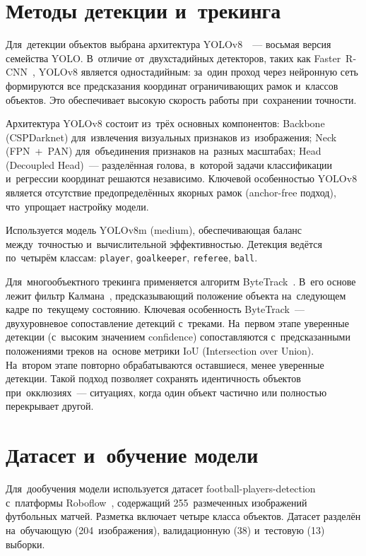 \documentclass{stud-conf-pmk}
\begin{document}
\begin{paper}
\section{Методы детекции и~трекинга}

Для~детекции объектов выбрана архитектура YOLOv8~\cite{bib_yolov8_ultralytics}~--- восьмая версия семейства YOLO. В~отличие от~двухстадийных детекторов, таких как Faster~R-CNN~\cite{bib_faster_rcnn}, YOLOv8 является одностадийным: за~один проход через нейронную сеть формируются все предсказания координат ограничивающих рамок и~классов объектов. Это обеспечивает высокую скорость работы при~сохранении точности.

Архитектура YOLOv8 состоит из~трёх основных компонентов: Backbone (CSPDarknet) для~извлечения визуальных признаков из~изображения; Neck (FPN~+~PAN) для~объединения признаков на~разных масштабах; Head (Decoupled Head)~--- разделённая голова, в~которой задачи классификации и~регрессии координат решаются независимо. Ключевой особенностью YOLOv8 является отсутствие предопределённых якорных рамок (anchor-free подход), что~упрощает настройку модели.

Используется модель YOLOv8m (medium), обеспечивающая баланс между~точностью и~вычислительной эффективностью. Детекция ведётся по~четырём классам: \texttt{player}, \texttt{goalkeeper}, \texttt{referee}, \texttt{ball}.

Для~многообъектного трекинга применяется алгоритм ByteTrack~\cite{bib_bytetrack}. В~его основе лежит фильтр Калмана~\cite{bib_kalman}, предсказывающий положение объекта на~следующем кадре по~текущему состоянию. Ключевая особенность ByteTrack~--- двухуровневое сопоставление детекций с~треками. На~первом этапе уверенные детекции (с~высоким значением confidence) сопоставляются с~предсказанными положениями треков на~основе метрики IoU (Intersection over Union). На~втором этапе повторно обрабатываются оставшиеся, менее уверенные детекции. Такой подход позволяет сохранять идентичность объектов при~окклюзиях~--- ситуациях, когда один объект частично или полностью перекрывает другой.


\section{Датасет и~обучение модели}

Для~дообучения модели используется датасет football-players-detection с~платформы Roboflow~\cite{bib_roboflow_dataset}, содержащий 255~размеченных изображений футбольных матчей. Разметка включает четыре класса объектов. Датасет разделён на~обучающую (204~изображения), валидационную (38) и~тестовую (13) выборки.


\end{paper}
\end{document}
